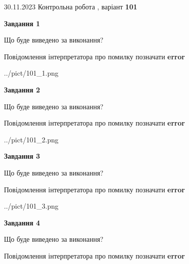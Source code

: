 \documentclass[12pt, ukrainian]{article}
\begin{document}
{{30.11.2023 Контрольна робота , варіант  \No \textbf { 101 }\par}}
{




{\begin {center}\textbf{Завдання 1}\end {center}}\par
Що буде виведено за виконання? \par
Повідомлення інтерпретатора про помилку позначати \textbf{error}

\begin{center}
	{../pict/101_1.png}
\end{center}
\newpage

{\begin {center}\textbf{Завдання 2}\end {center}}\par
Що буде виведено за виконання? \par
Повідомлення інтерпретатора про помилку позначати \textbf{error}

\begin{center}
	{../pict/101_2.png}
\end{center}
\newpage

{\begin {center}\textbf{Завдання 3}\end {center}}\par
Що буде виведено за виконання? \par
Повідомлення інтерпретатора про помилку позначати \textbf{error}

\begin{center}
	{../pict/101_3.png}
\end{center}
\newpage

{\begin {center}\textbf{Завдання 4}\end {center}}\par
Що буде виведено за виконання? \par
Повідомлення інтерпретатора про помилку позначати \textbf{error}

}
\end{document}
